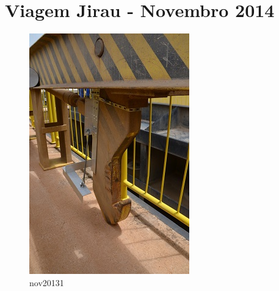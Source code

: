 \section{Viagem Jirau - Novembro 2014}

\begin{figure}[h!]
\centering
  \includegraphics[width=1\linewidth]{Fotos/Novembro2014/1.jpg}
  \caption{nov20131}
  \label{nov20131}
\end{figure}

